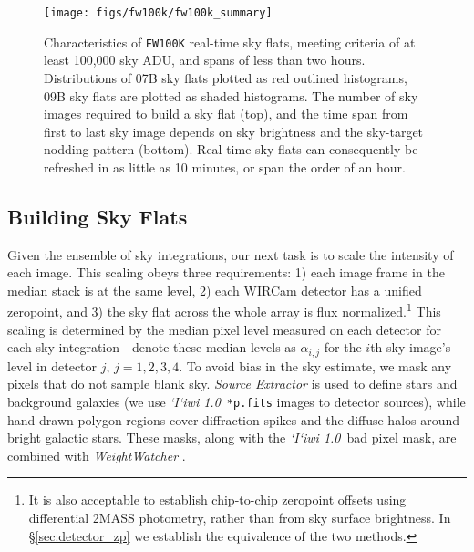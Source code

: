 \documentclass[iop]{emulateapj}
\newcommand{\sw}[1]{\textit{#1}} %
\newcommand{\iiwione}{\sw{`I`iwi 1.0}}
\newcommand{\Sec}[1]{\S\ref{sec:#1}}  %
\begin{document}
\begin{figure}[t]
\centering
\texttt{[image: figs/fw100k/fw100k\_summary]}
\caption{Characteristics of \texttt{FW100K} real-time sky flats, meeting criteria of at least 100,000 sky ADU, and spans of less than two hours.
Distributions of 07B sky flats plotted as red outlined histograms, 09B sky flats are plotted as shaded histograms.
The number of sky images required to build a sky flat (top), and the time span from first to last sky image depends on sky brightness and the sky-target nodding pattern (bottom).
Real-time sky flats can consequently be refreshed in as little as 10 minutes, or span the order of an hour.}
\label{fig:fw100k_summary}
\end{figure}

\subsection{Building Sky Flats}
\label{sec:flatbuilding}

Given the ensemble of sky integrations, our next task is to scale the intensity of each image.
This scaling obeys three requirements: 1) each image frame in the median stack is at the same level, 2) each WIRCam detector has a unified zeropoint, and 3) the sky flat across the whole array is flux normalized.\footnote{It is also acceptable to establish chip-to-chip zeropoint offsets using differential 2MASS photometry, rather than from sky surface brightness. In \Sec{detector_zp} we establish the equivalence of the two methods.}
This scaling is determined by the median pixel level measured on each detector for each sky integration---denote these median levels as $\alpha_{i,j}$ for the $i$th sky image's level in detector $j$, $j=1, 2, 3, 4$.
To avoid bias in the sky estimate, we mask any pixels that do not sample blank sky.
\sw{Source Extractor} \citep{Bertin:1996} is used to define stars and background galaxies (we use \iiwione\ \texttt{*p.fits} images to detector sources), while hand-drawn polygon regions cover diffraction spikes and the diffuse halos around bright galactic stars. These masks, along with the \iiwione\ bad pixel mask, are combined with \sw{WeightWatcher} \citep{Marmo:2008}.
\end{document}

